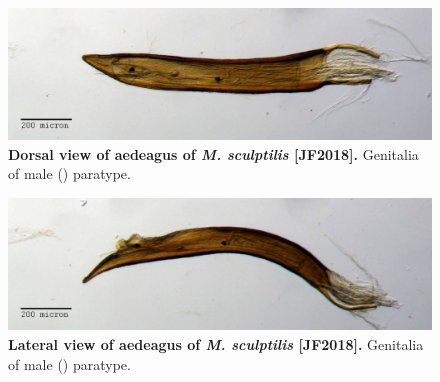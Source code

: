 \documentclass[fleqn,10pt,lineno]{wlpeerj} %
\begin{document}
\begin{figure}[h]
	\centering
	\begin{sideways}
		\includegraphics[width=0.95\textheight]{sculptilis_aedeagus_dorsal.jpg}
	\end{sideways}
	\caption{\textbf{Dorsal view of aedeagus of \textit{M. sculptilis} [JF2018].} Genitalia of male (\male) paratype.}
	\label{fig:sculptilis_aedeagus_dorsal}
\end{figure}

\begin{figure}[h]
	\centering
	\begin{sideways}
		\includegraphics[width=0.95\textheight]{sculptilis_aedeagus_lateral.jpg}
	\end{sideways}
	\caption{\textbf{Lateral view of aedeagus of \textit{M. sculptilis} [JF2018].} Genitalia of male (\male) paratype.}
	\label{fig:sculptilis_aedeagus_lateral}
\end{figure}
\end{document}
